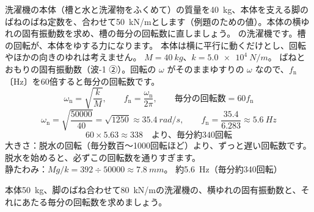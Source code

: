 \label{ph:波-2:ex3}
\begin{phreidai}[洗濯機の固有振動数]
洗濯機の本体（槽と水と洗濯物をふくめて）の質量を\qty{40}{kg}、本体を支える脚のばねのばね定数を、合わせて\qty{50}{kN/m}とします（例題のための値）。本体の横ゆれの固有振動数を求め、槽の毎分の回転数に直しましょう。
\phbamen
\bkhatenaref の洗濯機です。槽の回転が、本体をゆする力になります。
\phmushi
本体は横に平行に動くだけとし、回転やほかの向きのゆれは考えません。
\phzu
$M=\qty{40}{kg}$、$k=\qty{5.0e4}{N/m}$。
\phriyu
ばねとおもりの固有振動数（波-1 ②）。回転の $\omega$ がそのままゆすりの $\omega$ なので、$f_{\mathrm n}$〔Hz〕を60倍すると毎分の回転数です。
\phtateru
\[\omega_{\mathrm n}=\sqrt{\frac{k}{M}},\qquad f_{\mathrm n}=\frac{\omega_{\mathrm n}}{2\pi},\qquad \text{毎分の回転数}=60f_{\mathrm n}\]
\phtoku
\[\omega_{\mathrm n}=\sqrt{\frac{\num{50000}}{40}}=\sqrt{1250}\approx\qty{35.4}{rad/s},\qquad f_{\mathrm n}=\frac{35.4}{6.283}\approx\qty{5.6}{Hz}\]
\[60\times5.63\approx338\quad\text{より、毎分約340回転}\]
\phtashikame
大きさ：脱水の回転（毎分数百〜1000回転ほど）より、ずっと遅い回転数です。脱水を始めると、必ずこの回転数を通りすぎます。\\
静たわみ：$Mg/k=392\div\num{50000}\approx\qty{7.8}{mm}$。
\kotae 約\qty{5.6}{Hz}（毎分約340回転）
\end{phreidai}
\begin{jibun}
本体\qty{50}{kg}、脚のばね合わせて\qty{80}{kN/m}の洗濯機の、横ゆれの固有振動数と、それにあたる毎分の回転数を求めましょう。
\end{jibun}

